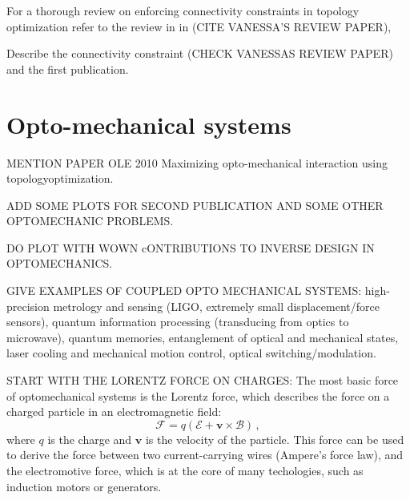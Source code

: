 For a thorough review on enforcing connectivity constraints in topology optimization
refer to the review in in (CITE VANESSA'S REVIEW PAPER),


Describe the connectivity constraint (CHECK VANESSAS REVIEW PAPER) and the first publication.

\section{Opto-mechanical systems~\cite{ownpub1,ownpub2,ownpub3}}

MENTION PAPER OLE 2010 Maximizing opto-mechanical interaction using topologyoptimization.


ADD SOME PLOTS FOR SECOND PUBLICATION AND SOME OTHER OPTOMECHANIC PROBLEMS.

DO PLOT WITH WOWN cONTRIBUTIONS TO INVERSE DESIGN IN OPTOMECHANICS.

GIVE EXAMPLES OF COUPLED OPTO MECHANICAL SYSTEMS: high-precision metrology and sensing (LIGO, extremely small displacement/force sensors),
quantum information processing (transducing from optics to microwave), quantum memories, 
entanglement of optical and mechanical states, laser cooling and mechanical motion control,
optical switching/modulation.

START WITH THE LORENTZ FORCE ON CHARGES:
The most basic force of optomechanical systems is the Lorentz force, which describes the force on a charged particle in an electromagnetic field:
\begin{equation}
    \mathbf{\mathcal{F}} = q \left( \mathbf{\mathcal{E}} + \mathbf{v} \times \mathbf{\mathcal{B}} \right)\,,
\end{equation}
where $q$ is the charge and $\mathbf{v}$ is the velocity of the particle. This force can be used to derive the force between two current-carrying 
wires (Ampere's force law), and the electromotive force, which is at the core of many techologies, such as induction motors or generators.

